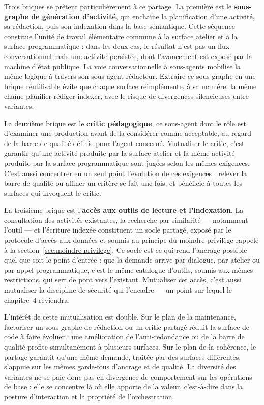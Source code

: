 Trois briques se prêtent particulièrement à ce partage. La première
est le \textbf{sous-graphe de génération d'activité}, qui enchaîne la
planification d'une activité, sa rédaction, puis son indexation dans
la base sémantique. Cette séquence constitue l'unité de travail
élémentaire commune à la surface atelier et à la surface
programmatique : dans les deux cas, le résultat n'est pas un flux
conversationnel mais une activité persistée, dont l'avancement est
exposé par la machine d'état publique. La voie conversationnelle à
sous-agents mobilise la même logique à travers son sous-agent
rédacteur. Extraire ce sous-graphe en une brique réutilisable évite
que chaque surface réimplémente, à sa manière, la même chaîne
planifier-rédiger-indexer, avec le risque de divergences silencieuses
entre variantes.

La deuxième brique est le \textbf{critic pédagogique}, ce sous-agent
dont le rôle est d'examiner une production avant de la considérer comme
acceptable, au regard de la barre de qualité définie pour l'agent
concerné. Mutualiser le critic, c'est garantir qu'une activité produite
par la surface atelier et la même activité produite par la surface
programmatique sont jugées selon les mêmes exigences. C'est aussi
concentrer en un seul point l'évolution de ces exigences : relever la
barre de qualité ou affiner un critère se fait une fois, et bénéficie à
toutes les surfaces qui invoquent le critic.

La troisième brique est l'\textbf{accès aux outils de lecture et
l'indexation}. La consultation des activités existantes, la recherche
par similarité — notamment l'outil  —
et l'écriture indexée constituent un socle partagé, exposé par le
protocole d'accès aux données et soumis au principe du moindre
privilège rappelé à la section~\ref{sec:moindre-privilege}. Ce socle
est ce qui rend l'ancrage possible quel que soit le point d'entrée :
que la demande arrive par dialogue, par atelier ou par appel
programmatique, c'est le même catalogue d'outils, soumis aux mêmes
restrictions, qui sert de pont vers l'existant. Mutualiser cet accès,
c'est aussi mutualiser la discipline de sécurité qui l'encadre — un
point sur lequel le chapitre~4 reviendra.

L'intérêt de cette mutualisation est double. Sur le plan de la
maintenance, factoriser un sous-graphe de rédaction ou un critic
partagé réduit la surface de code à faire évoluer : une amélioration
de l'anti-redondance ou de la barre de qualité profite simultanément
à plusieurs surfaces. Sur le plan de la cohérence, le partage garantit
qu'une même demande, traitée par des surfaces différentes, s'appuie
sur les mêmes garde-fous d'ancrage et de qualité. La diversité des
variantes ne se paie donc pas en divergence de comportement sur les
opérations de base : elle se concentre là où elle apporte de la valeur,
c'est-à-dire dans la posture d'interaction et la propriété de
l'orchestration.

